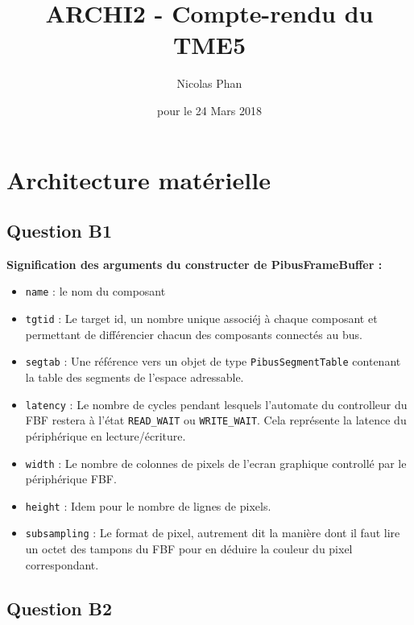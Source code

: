 \documentclass{article}
\title{ARCHI2 - Compte-rendu du TME5}
\author{Nicolas Phan}
\date{pour le 24 Mars 2018}
\begin{document}
\pagestyle{headings}
\maketitle
\tableofcontents
\newpage


\section{Architecture matérielle}

\subsection{Question B1}

\textbf{Signification des arguments du constructer de PibusFrameBuffer :}

\begin{itemize}
  \item \texttt{name} : le nom du composant
  \item \texttt{tgtid} : Le target id, un nombre unique associéj à chaque composant et permettant de différencier chacun des composants connectés au bus.
  \item \texttt{segtab} : Une référence vers un objet de type \texttt{PibusSegmentTable} contenant la table des segments de l'espace adressable.
  \item \texttt{latency} : Le nombre de cycles pendant lesquels l'automate du controlleur du FBF restera à l'état \texttt{READ\_WAIT} ou \texttt{WRITE\_WAIT}. Cela représente la latence du périphérique en lecture/écriture.
  \item \texttt{width} : Le nombre de colonnes de pixels de l'ecran graphique controllé par le périphérique FBF.
  \item \texttt{height} : Idem pour le nombre de lignes de pixels.
  \item \texttt{subsampling} : Le format de pixel, autrement dit la manière dont il faut lire un octet des tampons du FBF pour en déduire la couleur du pixel correspondant.
\end{itemize}


\subsection{Question B2}
\end{document}
